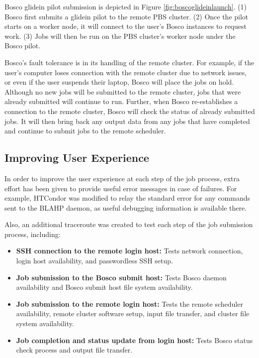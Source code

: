 \label{sec:boscoglidein}
Bosco glidein pilot submission is depicted in Figure \ref{fig:boscoglideinlaunch}.  (1) Bosco first submits a glidein pilot to the remote PBS cluster.  (2) Once the pilot starts on a worker node, it will connect to the user's Bosco instances to request work.  (3) Jobs will then be run on the PBS cluster's worker node under the Bosco pilot.

Bosco's fault tolerance is in its handling of the remote cluster.  For example, if the user's computer loses connection with the remote cluster due to network issues, or even if the user suspends their laptop, Bosco will place the jobs on hold.  Although no new jobs will be submitted to the remote cluster, jobs that were already submitted will continue to run.  Further, when Bosco re-establishes a connection to the remote cluster, Bosco will check the status of already submitted jobs.  It will then bring back any output data from any jobs that have completed and continue to submit jobs to the remote scheduler.

\subsection{Improving User Experience}


In order to improve the user experience at each step of the job process, extra effort has been given to provide useful error messages in case of failures.  For example, HTCondor was modified to relay the standard error for any commands sent to the BLAHP daemon, as useful debugging information is available there.  

\label{sec:boscotraceroute}

Also, an additional traceroute was created to test each step of the job submission process, including:

\begin{itemize}
\item \textbf{SSH connection to the remote login host:}  Tests network connection, login host availability, and passwordless SSH setup.
\item \textbf{Job submission to the Bosco submit host:}  Tests Bosco daemon availability and Bosco submit host file system availability.
\item \textbf{Job submission to the remote login host:}  Tests the remote scheduler availability, remote cluster software setup, input file transfer, and cluster file system availability.
\item \textbf{Job completion and status update from login host:}  Tests Bosco status check process and output file transfer.
\end{itemize}

